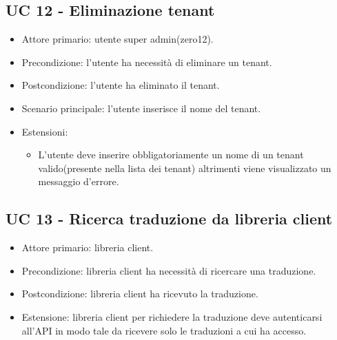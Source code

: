 \subsection{UC 12 - Eliminazione tenant}
    \begin{itemize}
        \item Attore primario: utente super admin(zero12).
        \item Precondizione: l'utente ha necessità di eliminare un tenant.
        \item Postcondizione: l'utente ha eliminato il tenant.
        \item Scenario principale: l'utente inserisce il nome del tenant.
        \item Estensioni: 
        \begin{itemize}
            \item L'utente deve inserire obbligatoriamente un nome di un tenant valido(presente nella lista dei tenant) altrimenti viene visualizzato un messaggio d'errore.
        \end{itemize}
    \end{itemize}
\subsection{UC 13 - Ricerca traduzione da libreria client}
    \begin{itemize}
        \item Attore primario: libreria client.
        \item Precondizione: libreria client ha necessità di ricercare una traduzione.
        \item Postcondizione: libreria client ha ricevuto la traduzione.
        \item Estensione: libreria client per richiedere la traduzione deve autenticarsi all'API in modo tale da ricevere solo le traduzioni a cui ha accesso.
    \end{itemize}


